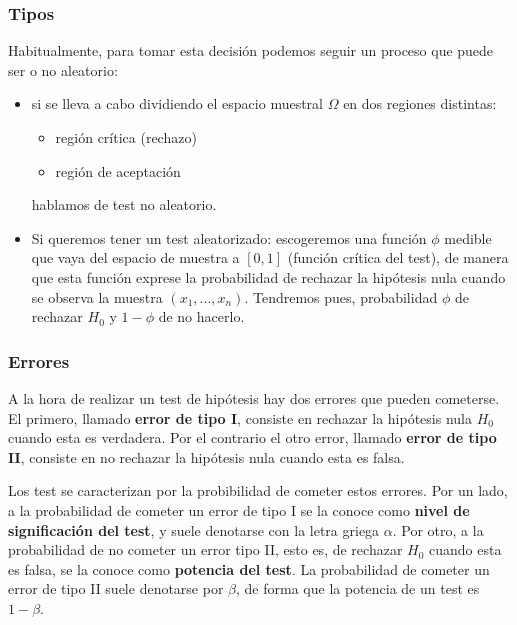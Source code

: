 \documentclass[a4paper,12pt]{article}
\begin{document}
\subsubsection{Tipos}
Habitualmente, para tomar esta decisión podemos seguir un proceso que puede ser o no aleatorio: 
\begin{itemize}
    \item si se lleva a cabo dividiendo el espacio muestral $\Omega$ en dos regiones distintas: 
	\begin{itemize}
		\item región crítica (rechazo)
		\item región de aceptación 
	\end{itemize} 
	hablamos de test no aleatorio.
	\item Si queremos tener un test aleatorizado: escogeremos una función $\phi$ medible que vaya del espacio de muestra a $[0,1]$ (función crítica del test), de manera que esta función exprese la probabilidad de rechazar la hipótesis nula cuando se observa la muestra $(x_1,...,x_n)$.
	Tendremos pues, probabilidad $\phi$ de rechazar $H_0$ y $1-\phi$ de no hacerlo. 
\end{itemize}

\subsubsection{Errores}

    A la hora de realizar un test de hipótesis hay dos errores que pueden cometerse.
    El primero, llamado \textbf{error de tipo I}, consiste en rechazar la hipótesis nula $H_0$ cuando esta es verdadera.
    Por el contrario el otro error, llamado \textbf{error de tipo II}, consiste en no rechazar la hipótesis nula cuando esta es falsa.

    Los test se caracterizan por la probibilidad de cometer estos errores.
    Por un lado, a la probabilidad de cometer un error de tipo I se la conoce como \textbf{nivel de significación del test}, y suele denotarse con la letra griega $\alpha$.
    Por otro, a la probabilidad de no cometer un error tipo II, esto es, de rechazar $H_0$ cuando esta es falsa, se la conoce como \textbf{potencia del test}.
    La probabilidad de cometer un error de tipo II suele denotarse por $\beta$, de forma que la potencia de un test es $1 - \beta$.

\end{document}
